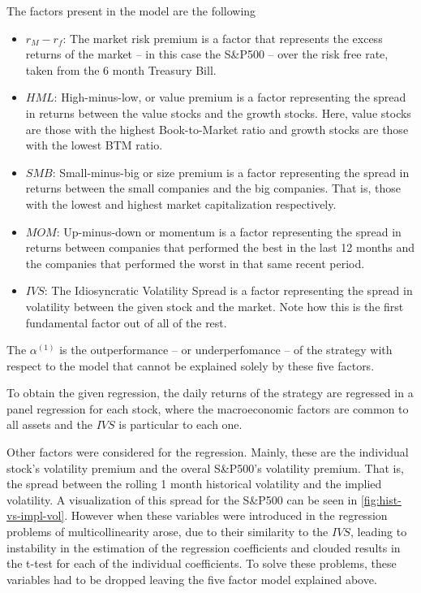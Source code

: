 The factors present in the model are the following 
\begin{itemize}
    \item $r_M-r_f$: The market risk premium is a factor that represents the excess returns of the market -- in this case the S\&P500 -- over the risk free rate, taken from the 6 month Treasury Bill. 
    \item $HML$: High-minus-low, or value premium is a factor representing the spread in returns between the value stocks and the growth stocks. Here, value stocks are those with the highest Book-to-Market ratio and growth stocks are those with the lowest BTM ratio.
    \item $SMB$: Small-minus-big or size premium is a factor representing the spread in returns between the small companies and the big companies. That is, those with the lowest and highest market capitalization respectively.
    \item $MOM$: Up-minus-down or momentum is a factor representing the spread in returns between companies that performed the best in the last 12 months and the companies that performed the worst in that same recent period. 
    \item $IVS$: The Idiosyncratic Volatility Spread is a factor representing the spread in volatility between the given stock and the market. Note how this is the first fundamental factor out of all of the rest.
\end{itemize}

The $\alpha^{(1)}$ is the outperformance -- or underperfomance -- of the strategy with respect to the model that cannot be explained solely by these five factors. 

To obtain the given regression, the daily returns of the strategy are regressed in a panel regression for each stock, where the macroeconomic factors are common to all assets and the $IVS$ is particular to each one. 

Other factors were considered for the regression. Mainly, these are the individual stock's volatility premium and the overal S\&P500's volatility premium. That is, the spread between the rolling 1 month historical volatility and the implied volatility. A visualization of this spread for the S\&P500 can be seen in \autoref{fig:hist-vs-impl-vol}. However when these variables were introduced in the regression problems of multicollinearity arose, due to their similarity to the $IVS$, leading to instability in the estimation of the regression coefficients and clouded results in the t-test for each of the individual coefficients. To solve these problems, these variables had to be dropped leaving the five factor model explained above.

